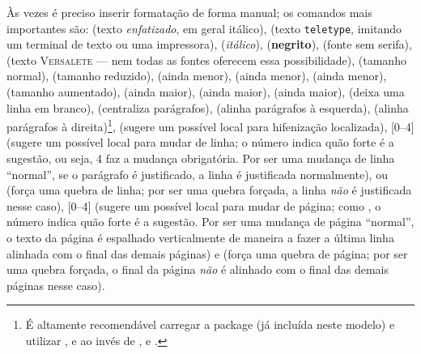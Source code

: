 Às vezes é preciso inserir formatação de forma manual; os comandos mais
importantes são:
 (texto \emph{enfatizado}, em geral itálico),
 (texto \texttt{teletype}, imitando um
                terminal de texto ou uma impressora),
 (\textit{itálico}),
 (\textbf{negrito}),
 (fonte \textsf{sem serifa}),
 (texto \textsc{Versalete} --- nem todas
                as fontes oferecem essa possibilidade),
 (tamanho normal),
 (tamanho reduzido),
 (ainda menor),
 (ainda menor),
 (ainda menor),
 (tamanho aumentado),
 (ainda maior),
 (ainda maior),
 (ainda maior),
 (deixa uma linha em branco),
 (centraliza parágrafos),
 (alinha parágrafos à esquerda),
 (alinha parágrafos à direita)\footnote{É
                             altamente recomendável carregar a package
                              (já incluída neste modelo)
                             e utilizar ,  e
                              ao invés de ,
                              e .},
\ltxcmd{-} (sugere um possível local para hifenização localizada),
[0--4] (sugere um possível local para mudar de linha;
                         o número indica quão forte é a sugestão, ou
                         seja, 4 faz a mudança obrigatória. Por ser uma
                         mudança de linha ``normal'', se o parágrafo é
                         justificado, a linha é justificada normalmente),
 ou \cmd{\sla\sla} (força uma quebra de linha; por ser
                                   uma quebra forçada, a linha \emph{não}
                                   é justificada nesse caso),
[0--4] (sugere um possível local para mudar de página;
                         como , o número indica quão
                         forte é a sugestão. Por ser uma mudança de página
                         ``normal'', o texto da página é espalhado
                         verticalmente de maneira a fazer a última linha
                         alinhada com o final das demais páginas) e
 (força uma quebra de página; por ser uma quebra forçada,
                 o final da página \emph{não} é alinhado com o final das
                 demais páginas nesse caso).

